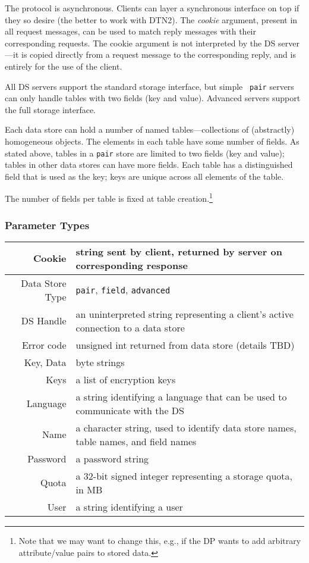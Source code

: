 The protocol is asynchronous. Clients can layer a synchronous
interface on top if they so desire (the better to work with DTN2). The
{\em cookie} argument, present in all request messages, can be used to
match reply messages with their corresponding requests. The cookie
argument is not interpreted by the DS server---it is copied directly from
a request message to the corresponding reply, and is entirely for the
use of the client.

All DS servers support the standard storage interface, but simple {\tt
pair} servers can only handle tables with two fields (key and
value). Advanced servers support the full storage interface.

Each data store can hold a number of named tables---collections of
(abstractly) homogeneous objects. The elements in each table have some
number of fields.  As stated above, tables in a {\tt pair}
store are limited to two fields (key and value); tables in other data
stores can have more fields. Each table has a distinguished field that
is used as the key; keys are unique across all elements of the table.

The number of fields per table is fixed at table creation.\footnote{Note that
we may want to change this, e.g., if the DP wants to add arbitrary
attribute/value pairs to stored data.} 

\subsubsection{Parameter Types}

\begin{tabular}{|r|p{5in}|}
\hline
Cookie & string sent by client, returned by server on corresponding response \\ \hline
Data Store Type & {\tt pair}, {\tt field}, {\tt advanced} \\ \hline
DS Handle & an uninterpreted string representing a client's active connection to a data store \\ \hline
Error code & unsigned int returned from data store (details TBD) \\ \hline
Key, Data & byte strings \\ \hline
Keys & a list of encryption keys \\ \hline
Language & a string identifying a language that can be used to communicate with the DS \\ \hline
Name & a character string, used to identify data store names, table names, and field names \\ \hline
Password & a password string \\ \hline
Quota & a 32-bit signed integer representing a storage quota, in MB \\ \hline
User & a string identifying a user \\ \hline
\end{tabular}

